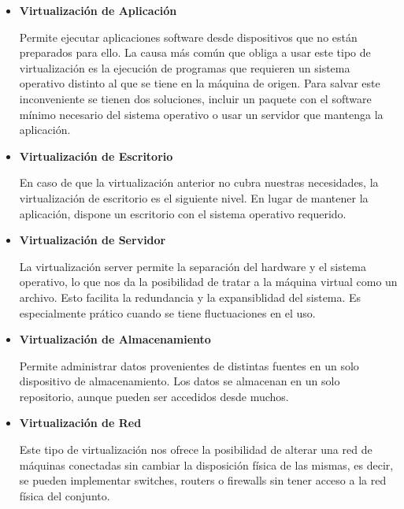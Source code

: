 \begin{itemize}
	\item \textbf{Virtualización de Aplicación}
	
	Permite ejecutar aplicaciones software desde dispositivos que no están preparados para ello. La causa más común que obliga a usar este tipo de virtualización
	es la ejecución de programas que requieren un sistema operativo distinto al que se tiene en la máquina de origen. Para salvar este inconveniente se tienen dos soluciones,
	incluir un paquete con el software mínimo necesario del sistema operativo o usar un servidor que mantenga la aplicación.
	
	\item \textbf{Virtualización de Escritorio}
	
	En caso de que la virtualización anterior no cubra nuestras necesidades, la virtualización de escritorio es el siguiente nivel. En lugar de mantener la aplicación, 
	dispone un escritorio con el sistema operativo requerido.
	
	\item \textbf{Virtualización de Servidor}
	
	La virtualización server permite la separación del hardware y el sistema operativo, lo que nos da la posibilidad de tratar a la máquina virtual como un archivo.
	Esto facilita la redundancia y la expansiblidad del sistema. Es especialmente prático cuando se tiene fluctuaciones en el uso.
	
	\item \textbf{Virtualización de Almacenamiento}
	
	Permite administrar datos provenientes de distintas fuentes en un solo dispositivo de almacenamiento. Los datos se almacenan en un solo repositorio, 
 aunque pueden ser accedidos desde muchos.
	
	\item \textbf{Virtualización de Red}
	
	Este tipo de virtualización nos ofrece la posibilidad de alterar una red de máquinas conectadas sin cambiar la disposición física de las mismas, es decir, se
	pueden implementar switches, routers o firewalls sin tener acceso a la red física del conjunto.
	
\end{itemize}








